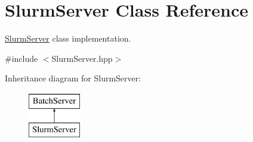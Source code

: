 \hypertarget{classSlurmServer}{
\section{SlurmServer Class Reference}
\label{classSlurmServer}
}


\hyperlink{classSlurmServer}{SlurmServer} class implementation.  




{\ttfamily \#include $<$SlurmServer.hpp$>$}

Inheritance diagram for SlurmServer:\begin{figure}[H]
\begin{center}
\leavevmode
\includegraphics[height=2.000000cm]{classSlurmServer}
\end{center}
\end{figure}
